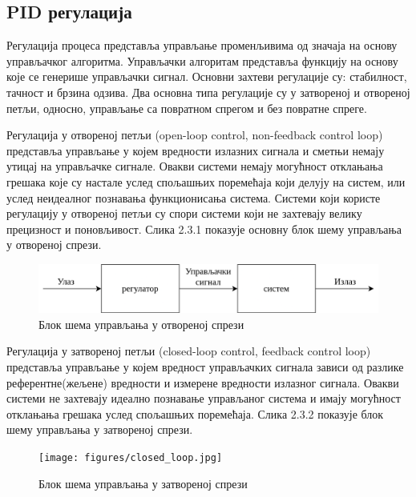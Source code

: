 \documentclass[12pt]{article}
\begin{document}
\subsection{PID регулација}
Регулација процеса представља управљање променљивима од значаја на основу управљачког алгоритма. Управљачки алгоритам представља функцију на основу које се генерише управљачки сигнал. Основни захтеви регулације су: стабилност, тачност и брзина одзива. Два основна типа регулације су у затвореној и отвореној петљи, односно, управљање са повратном спрегом и без повратне спреге. 

Регулација у отвореној петљи (open-loop control, non-feedback control loop) представља управљање у којем вредности излазних сигнала и сметњи немају утицај на управљачке сигнале. Овакви системи немају могућност отклањања грешака које су настале услед спољашњих поремећаја који делују на систем, или услед неидеалног познавања функционисања система. Системи који користе регулацију у отвореној петљи су спори системи који не захтевају велику прецизност и поновљивост. Слика 2.3.1 показује основну блок шему управљања у отвореној спрези.

\begin{figure}[H]
    \centering
    \includegraphics[width=14cm]{figures/open_loop.drawio.png}
    \caption{Блок шема управљања у отвореној спрези}
    \label{fig:отворена_спрега}
\end{figure}

Регулација у затвореној петљи (closed-loop control, feedback control loop) представља управљање у којем вредност управљачких сигнала зависи од разлике референтне(жељене) вредности и измерене вредности излазног сигнала. Овакви системи не захтевају идеално познавање управљаног система и имају могућност отклањања грешака услед спољашњих поремећаја. Слика 2.3.2 показује блок шему управљања у затвореној спрези.

\begin{figure}[H]
    \centering
    \texttt{[image: figures/closed\_loop.jpg]}
    \caption{Блок шема управљања у затвореној спрези}
    \label{fig:затворена_спрега}
\end{figure}
\end{document}

